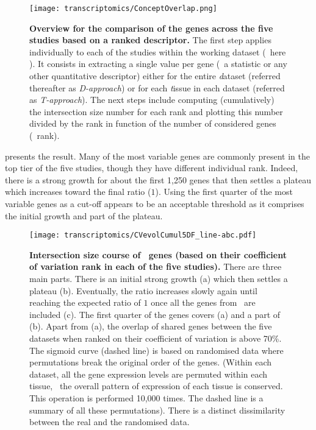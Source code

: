 \begin{figure}[!htb]
    \texttt{[image: transcriptomics/ConceptOverlap.png]}\centering
    \caption[Overview for the comparison of the genes across the five
    studies based on a ranked descriptor 5 studies]{\label{fig:overlapConcept}%
    \textbf{Overview for the comparison of the genes across the five
    studies based on a ranked descriptor.}
    The first step applies individually to each of the studies
    within the working dataset (\ie\ here \setOne).
    It consists in extracting a single value per gene
    (\eg\ a statistic or any other quantitative descriptor)
    either for the entire \emph{d}ataset (referred thereafter as \emph{D-approach}) or
    for each \emph{t}issue in each dataset (referred as \emph{T-approach}).
    The next steps include
    computing (cumulatively) the intersection size number for each rank
    and plotting this number divided by the rank
    in function of the number of considered genes (\ie\ rank).}
\end{figure}

 presents the result.
Many of the most variable genes are commonly present in the top tier of the
five studies, though they have different individual rank.
Indeed, there is a strong growth for about the first 1,250 genes that then
settles a plateau which increases toward the final ratio ($1$).
Using the first quarter of the most variable genes as a cut-off appears
to be an acceptable threshold
as it comprises the initial growth and part of the plateau.

\begin{figure}[!htb]
    \texttt{[image: transcriptomics/CVevolCumul5DF\_line-abc.pdf]}\centering
    \vspace{-0.15in}
    \caption[Intersection size of \setOne\ genes (ranked by cv)]%
    {\label{fig:cvEvol5DF}\textbf{Intersection size course
    of \setOne\ genes (based on their coefficient of variation rank
    in each of the five studies).}
    There are three main parts.
    There is an initial strong growth (a)
    which then settles a plateau (b).
    Eventually, the ratio increases slowly again
    until reaching the expected ratio of $1$ once all the genes from \setOne\
    are included (c).
    The first quarter of the genes covers (a) and a part of (b).
    Apart from (a),
    the overlap of shared genes between the five datasets when ranked on their
    coefficient of variation is above 70\%.
    The sigmoid curve (dashed line) is based on randomised data
    where permutations break the original order of the genes. (Within each dataset,
    all the gene expression levels are permuted within each tissue,
    \ie\ the overall pattern of expression of each tissue is conserved.
    This operation is performed 10,000 times.
    The dashed line is a summary of all these permutations).
    There is a distinct dissimilarity between the real and the randomised data.}
\end{figure}

